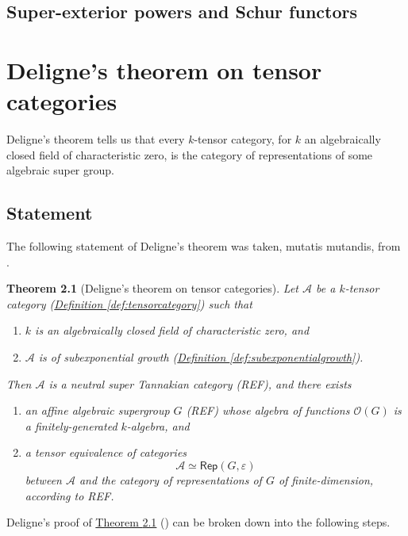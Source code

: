 \documentclass[a4paper]{report}
\theoremstyle{definition}
\theoremstyle{plain}
\newtheorem{theorem}{Theorem}[section]
\theoremstyle{remark}
\begin{document}
\section{Super-exterior powers and Schur functors}

\chapter{Deligne's theorem on tensor categories}
Deligne's theorem tells us that every $k$-tensor category, for $k$ an algebraically closed field of characteristic zero, is the category of representations of some algebraic super group.

\section{Statement}

The following statement of Deligne's theorem was taken, mutatis mutandis, from \cite{nlab-deligne-theorem}.

\begin{theorem}[Deligne's theorem on tensor categories]
  \label{thm:delignestheorem}
  Let $\mathscr{A}$ be a $k$-tensor category (\hyperref[def:tensorcategory]{Definition \ref*{def:tensorcategory}}) such that
  \begin{enumerate}
    \item $k$ is an algebraically closed field of characteristic zero, and

    \item $\mathscr{A}$ is of subexponential growth (\hyperref[def:subexponentialgrowth]{Definition \ref*{def:subexponentialgrowth}}).
  \end{enumerate}

  Then $\mathscr{A}$ is a neutral super Tannakian category (REF), and there exists 
  \begin{enumerate}
    \item an affine algebraic supergroup $G$ (REF) whose algebra of functions $\mathscr{O}(G)$ is a finitely-generated $k$-algebra, and 

    \item a tensor equivalence of categories
      \begin{equation*}
        \mathscr{A} \simeq \mathsf{Rep}(G, \varepsilon)
      \end{equation*}
      between $\mathscr{A}$ and the category of representations of $G$ of finite-dimension, according to REF.
  \end{enumerate}
\end{theorem}
Deligne's proof of \hyperref[thm:delignestheorem]{Theorem \ref*{thm:delignestheorem}} (\cite{deligne-categories-tensorielle}) can be broken down into the following steps.
\end{document}
